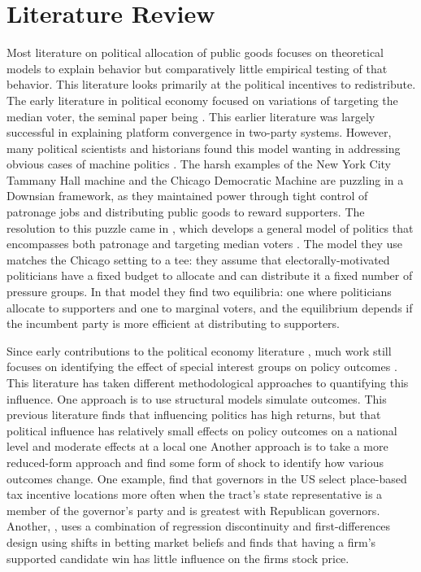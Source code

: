 \section{Literature Review}\label{sec:lit_review}

Most literature on political allocation of public goods focuses on theoretical models to explain behavior but comparatively little empirical testing of that behavior. 
This literature looks primarily at the political incentives to redistribute.
The early literature in political economy focused on variations of targeting the median voter, the seminal paper being \cite{downs1957economic}.
This earlier literature was largely successful in explaining platform convergence in two-party systems.
However, many political scientists and historians found this model wanting in addressing obvious cases of machine politics \citep{rakove1975don, golway2014machine}.
The harsh examples of the New York City Tammany Hall machine and the Chicago Democratic Machine are puzzling in a Downsian framework, as they maintained power through tight control of patronage jobs and distributing public goods to reward supporters.
The resolution to this puzzle came in \cite{dixit_londregan1996}, which develops a general model of politics that encompasses both patronage and targeting median voters .
The model they use matches the Chicago setting to a tee: they assume that electorally-motivated politicians have a fixed budget to allocate and can distribute it a fixed number of pressure groups.
In that model they find two equilibria: one where politicians allocate to supporters and one to marginal voters, and the equilibrium depends if the incumbent party is more efficient at distributing to supporters.


Since early contributions to the political economy literature \cite{grossman_helpman_1996}, much work still focuses on identifying the effect of special interest groups on policy outcomes \citep{bombardini_trebbi2020}. 
This literature has taken different methodological approaches to quantifying this influence.
One approach is to use structural models simulate outcomes.
This previous literature finds that influencing politics has high returns, but that political influence has relatively small effects on policy outcomes on a national level and moderate effects at a local one \citep{kang2015,finan2021electoral}
Another approach is to take a more reduced-form approach and find some form of shock to identify how various outcomes change.
One example, \cite{frank_hoopes_lester_2022} find that governors in the US select place-based tax incentive locations more often when the tract's state representative is a member of the governor's party and is greatest with Republican governors.
Another, \cite{fowleretalquidproquo} , uses a combination of regression discontinuity and first-differences design using shifts in betting market beliefs and finds that having a firm's supported candidate win has little influence on the firms stock price.

